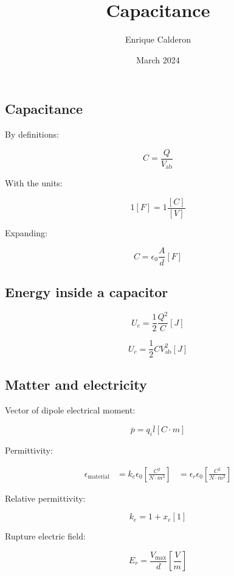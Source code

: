 \documentclass[letterpaper]{article}
\title{Capacitance}
\author{Enrique Calderon}
\date{March 2024}
\newcommand{\divline}{\noindent\makebox[\linewidth]{\rule{\textwidth}{0.4pt}}}
\begin{document}
    \maketitle

    \divline
    \begin{multicols}{3}
        \section{Capacitance}

        By definitions:

        \[C = \frac{Q}{V_{\text{ab}}}\]

        With the units:

        \[ 1[F] = 1\frac{[C]}{[V]}\]

        Expanding:

        \[C = \epsilon_{0} \frac{A}{d} [F]\]
    \end{multicols}

    \divline
    \begin{multicols}{2}
        \section{Energy inside a capacitor}
        
        \[U_{c} = \frac{1}{2} \frac{Q^{2}}{C} [J]\]

        \[U_{c} = \frac{1}{2} C V^{2}_{\text{ab}} [J]\]
        
    \end{multicols}

    \divline
    \begin{multicols}{2}
        \section{Matter and electricity}

        Vector of dipole electrical moment:

        \[\overline{p}  = q_{i} \overline{l} [C \cdot m]\]

        Permittivity:

        \begin{align*}
            \epsilon_{\text{material}} &= k_{e} \epsilon_{0} \left[ \frac{C^{2}}{N \cdot m^{2}} \right]
                &= \epsilon_{r} \epsilon_{0} \left[ \frac{C^{2}}{N \cdot m^{2}} \right]
        \end{align*}

        Relative permittivity:

        \[k_{e} = 1 + x_{e} [1]\]

        Rupture electric field:

        \[E_{r} = \frac{V_{\text{max}}}{d} \left[ \frac{V}{m} \right]\]
    \end{multicols}
\end{document}
